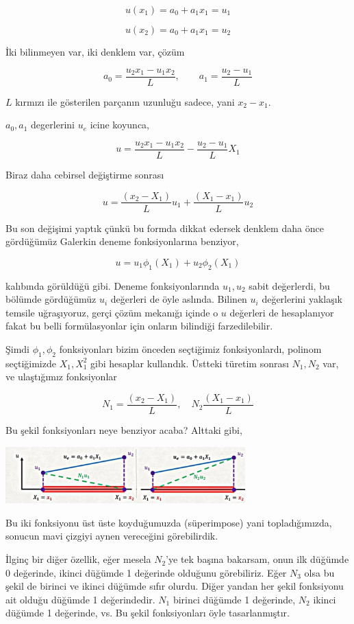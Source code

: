\documentclass[12pt,fleqn]{article}\usepackage{../../common}
\begin{document}
$$
u(x_1) = a_0 + a_1 x_1 = u_1
$$

$$
u(x_2) = a_0 + a_1 x_1 = u_2
$$

İki bilinmeyen var, iki denklem var, çözüm

$$
a_0 = \frac{u_2 x_1 - u_1 x_2}{L}, \qquad a_1 = \frac{u_2 - u_1}{L}
$$

$L$ kırmızı ile gösterilen parçanın uzunluğu sadece, yani $x_2 - x_1$.

$a_0,a_1$ degerlerini $u_e$ icine koyunca,

$$
u = \frac{u_2 x_1 - u_1 x_2}{L} - \frac{u_2 - u_1}{L} X_1
$$

Biraz daha cebirsel değiştirme sonrası

$$
u = \frac{(x_2 - X_1)}{L} u_1 + \frac{(X_1 - x_1)}{L} u_2
$$

Bu son değişimi yaptık çünkü bu formda dikkat edersek denklem daha önce
gördüğümüz Galerkin deneme fonksiyonlarına benziyor,

$$
u = u_1 \phi_1(X_1) + u_2 \phi_2 (X_1)
$$

kalıbında görüldüğü gibi. Deneme fonksiyonlarında $u_1,u_2$ sabit değerlerdi, bu
bölümde gördüğümüz $u_i$ değerleri de öyle aslında. Bilinen $u_i$ değerlerini
yaklaşık temsile uğraşıyoruz, gerçi çözüm mekanığı içinde o $u$ değerleri de
hesaplanıyor fakat bu belli formülasyonlar için onların bilindiği
farzedilebilir.

Şimdi $\phi_1,\phi_2$ fonksiyonları bizim önceden seçtiğimiz fonksiyonlardı,
polinom seçtiğimizde $X_1,X_1^2$ gibi hesaplar kullandık. Üstteki türetim
sonrası $N_1,N_2$ var, ve ulaştığımız fonksiyonlar

$$
N_1 = \frac{(x_2 - X_1)}{L}, \quad N_2 \frac{(X_1 - x_1)}{L} 
$$

Bu şekil fonksiyonları neye benziyor acaba? Alttaki gibi,

\includegraphics[width=25em]{compscieng_bpp45fem2_08.jpg}

Bu iki fonksiyonu üst üste koyduğumuzda (süperimpose) yani topladığımızda,
sonucun mavi çizgiyi aynen vereceğini görebilirdik.

İlginç bir diğer özellik, eğer mesela $N_2$'ye tek başına bakarsam, onun ilk
düğümde 0 değerinde, ikinci düğümde 1 değerinde olduğunu görebiliriz.  Eğer
$N_3$ olsa bu şekil de birinci ve ikinci düğümde sıfır olurdu. Diğer yandan her
şekil fonksiyonu ait olduğu düğümde 1 değerindedir. $N_1$ birinci düğümde 1
değerinde, $N_2$ ikinci düğümde 1 değerinde, vs. Bu şekil fonksiyonları öyle
tasarlanmıştır.
\end{document}
